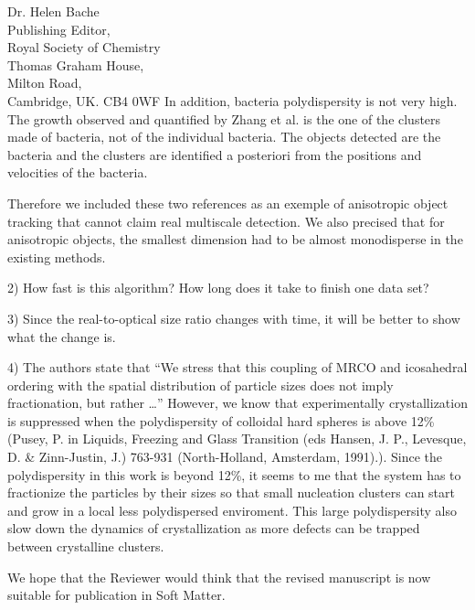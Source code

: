 \documentclass[a4paper, rebuttal, parskip=true, firsthead=false, fromemail=true, foldmarks=false]{scrlttr2}
\begin{document}
\begin{letter}{Dr. Helen Bache\\
Publishing Editor,\\
Royal Society of Chemistry\\
Thomas Graham House,\\
Milton Road,\\
Cambridge, UK. CB4 0WF}
In addition, bacteria polydispersity is not very high. The growth observed and quantified by Zhang et al. is the one of the clusters made of bacteria, not of the individual bacteria. The objects detected are the bacteria and the clusters are identified a posteriori from the positions and velocities of the bacteria.

Therefore we included these two references as an exemple of anisotropic object tracking that cannot claim real multiscale detection. We also precised that for anisotropic objects, the smallest dimension had to be almost monodisperse in the existing methods.

\begin{quotationi}
2)      How fast is this algorithm? How long does it take to finish one data set?
\end{quotationi}

\begin{quotationi}
3)      Since the real-to-optical size ratio changes with time, it will be better to show what the change is.
\end{quotationi}

\begin{quotationi}4) The authors state that ``We stress that this coupling of MRCO and icosahedral ordering with the spatial distribution of particle sizes does not imply fractionation, but rather \ldots'' However, we know that experimentally crystallization is suppressed when the polydispersity of colloidal hard spheres is above 12\% (Pusey, P. in Liquids, Freezing and Glass Transition (eds Hansen, J. P., Levesque, D. \& Zinn-Justin, J.) 763-931 (North-Holland, Amsterdam, 1991).). Since the polydispersity in this work is beyond 12\%, it seems to me that the system has to fractionize the particles by their sizes so that small nucleation clusters can start and grow in a local less polydispersed enviroment. This large polydispersity also slow down the dynamics of crystallization as more defects can be trapped between crystalline clusters.
\end{quotationi}

We hope that the Reviewer would think that the revised manuscript is now suitable for publication in Soft Matter. 


\end{letter} 
\end{document}
